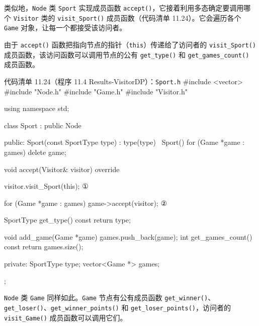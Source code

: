 
类似地，\texttt{Node} 类 \texttt{Sport} 实现成员函数 \texttt{accept()}，它接着利用多态确定要调用哪个 \texttt{Visitor} 类的 \texttt{visit\_\allowbreak{}Sport(\allowbreak{})\allowbreak{}} 成员函数（代码清单 11.24）。它会遍历各个 \texttt{Game} 对象，让每一个都接受该访问者。

由于 \texttt{accept()} 函数把指向节点的指针（\texttt{this}）传递给了访问者的 \texttt{visit\_\allowbreak{}Sport(\allowbreak{})\allowbreak{}} 成员函数，该访问函数可以调用节点的公有 \texttt{get\_\allowbreak{}type(\allowbreak{})\allowbreak{}} 和 \texttt{get\_\allowbreak{}games\_\allowbreak{}count(\allowbreak{})\allowbreak{}} 成员函数。

\begin{codeboxt}{代码清单 11.24（程序 11.4 Results-VisitorDP）：\texttt{Sport.h}}
#include <vector>
#include "Node.h"
#include "Game.h"
#include "Visitor.h"

using namespace std;

class Sport : public Node
{
public:
    Sport(const SportType type) : type(type) {}
    ~Sport() { for (Game *game : games) delete game; }

    void accept(Visitor& visitor) override
    {
        visitor.visit_Sport(this);                       ①

        for (Game *game : games) game->accept(visitor);  ②
    }

    SportType get_type() const { return type; }

    void add_game(Game *game) { games.push_back(game); }
    int get_games_count() const { return games.size(); }

private:
    SportType type;
    vector<Game *> games;
};
\end{codeboxt}
\par
{}\par

\texttt{Node} 类 \texttt{Game} 同样如此。\texttt{Game} 节点有公有成员函数 \texttt{get\_\allowbreak{}winner(\allowbreak{})\allowbreak{}}、\texttt{get\_\allowbreak{}loser(\allowbreak{})\allowbreak{}}、\texttt{get\_\allowbreak{}winner\_\allowbreak{}points(\allowbreak{})\allowbreak{}} 和 \texttt{get\_\allowbreak{}loser\_\allowbreak{}points(\allowbreak{})\allowbreak{}}，访问者的 \texttt{visit\_\allowbreak{}Game(\allowbreak{})\allowbreak{}} 成员函数可以调用它们。

